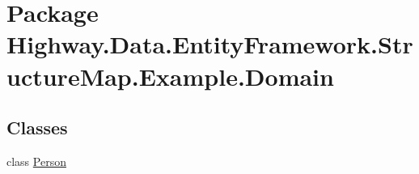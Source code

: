 \hypertarget{namespace_highway_1_1_data_1_1_entity_framework_1_1_structure_map_1_1_example_1_1_domain}{\section{Package Highway.\-Data.\-Entity\-Framework.\-Structure\-Map.\-Example.\-Domain}
\label{namespace_highway_1_1_data_1_1_entity_framework_1_1_structure_map_1_1_example_1_1_domain}
}
\subsection*{Classes}
\begin{DoxyCompactItemize}
\item 
class \hyperlink{class_highway_1_1_data_1_1_entity_framework_1_1_structure_map_1_1_example_1_1_domain_1_1_person}{Person}
\end{DoxyCompactItemize}
